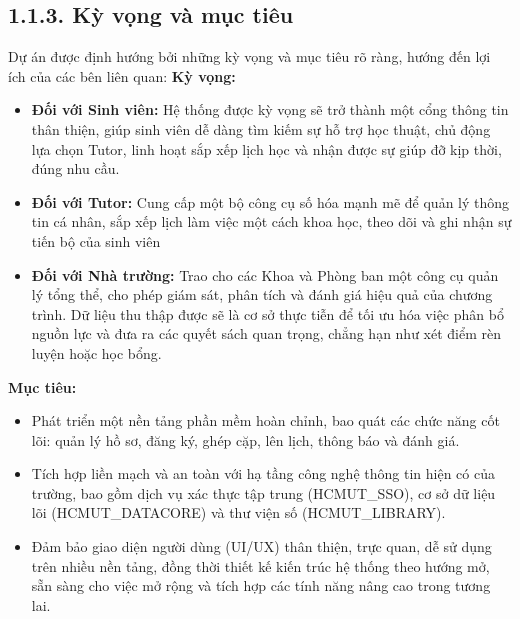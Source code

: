 \subsection*{1.1.3. Kỳ vọng và mục tiêu}
Dự án được định hướng bởi những kỳ vọng và mục tiêu rõ ràng, hướng đến lợi ích của các bên liên quan:
\textbf{Kỳ vọng:}
\begin{itemize}
    \item \textbf{Đối với Sinh viên:}  Hệ thống được kỳ vọng sẽ trở thành một cổng thông tin thân thiện, giúp sinh viên dễ dàng tìm kiếm sự hỗ trợ học thuật, chủ động lựa chọn Tutor, linh hoạt sắp xếp lịch học và nhận được sự giúp đỡ kịp thời, đúng nhu cầu.
    \item \textbf{Đối với Tutor:} Cung cấp một bộ công cụ số hóa mạnh mẽ để quản lý thông tin cá nhân, sắp xếp lịch làm việc một cách khoa học, theo dõi và ghi nhận sự tiến bộ của sinh viên
    \item \textbf{Đối với Nhà trường:} Trao cho các Khoa và Phòng ban một công cụ quản lý tổng thể, cho phép giám sát, phân tích và đánh giá hiệu quả của chương trình. Dữ liệu thu thập được sẽ là cơ sở thực tiễn để tối ưu hóa việc phân bổ nguồn lực và đưa ra các quyết sách quan trọng, chẳng hạn như xét điểm rèn luyện hoặc học bổng.
\end{itemize}
\textbf{Mục tiêu:}
\begin{itemize}
    \item Phát triển một nền tảng phần mềm hoàn chỉnh, bao quát các chức năng cốt lõi: quản lý hồ sơ, đăng ký, ghép cặp, lên lịch, thông báo và đánh giá.
    \item Tích hợp liền mạch và an toàn với hạ tầng công nghệ thông tin hiện có của trường, bao gồm dịch vụ xác thực tập trung (HCMUT\_SSO), cơ sở dữ liệu lõi (HCMUT\_DATACORE) và thư viện số (HCMUT\_LIBRARY).
    \item Đảm bảo giao diện người dùng (UI/UX) thân thiện, trực quan, dễ sử dụng trên nhiều nền tảng, đồng thời thiết kế kiến trúc hệ thống theo hướng mở, sẵn sàng cho việc mở rộng và tích hợp các tính năng nâng cao trong tương lai.
\end{itemize}


